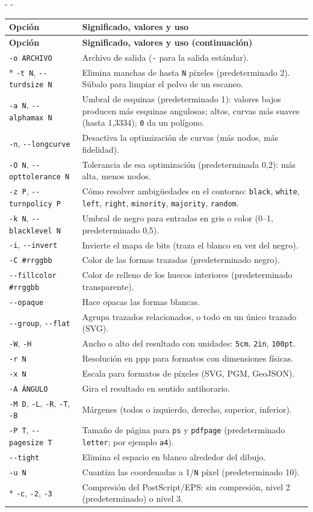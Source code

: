 \documentclass[11pt,a4paper]{article}
\makeatletter
\newcommand{\necesitaespacio}[1]{\par\penalty-100\begingroup
	\setlength{\dimen@}{#1}\dimen@ii\pagegoal\advance\dimen@ii-\pagetotal
	\ifdim\dimen@>\dimen@ii\ifdim\dimen@ii>\z@\vfil\fi\penalty-\@M\fi\endgroup}
\newenvironment{opciones}[1][Opción]{%
	\par\begingroup\small
	\begin{longtable}{L{4.25cm}L{11.2cm}}
		\toprule\rowcolor{tablacab}\cab{#1} & \cab{Significado, valores y uso} \\ \midrule
		\endfirsthead
		\toprule\rowcolor{tablacab}\cab{#1} & \cab{Significado, valores y uso (continuación)} \\ \midrule
		\endhead
		\bottomrule
		\endfoot}
	{\end{longtable}\endgroup}
\newcommand{\opt}[1]{\texttt{\textcolor{colopt}{#1}}}      %
\newcommand{\val}[1]{\texttt{#1}}                          %
\newcommand{\cab}[1]{\textbf{#1}}
\makeatother
\begin{document}
	\necesitaespacio{10\baselineskip}
	\begin{opciones}
		\opt{-o ARCHIVO} & Archivo de salida (\val{-} para la salida estándar).\\*
		\opt{-t N}, \opt{-{}-turdsize N} & Elimina manchas de hasta \val{N} píxeles (predeterminado 2). Súbalo para limpiar el polvo de un escaneo.\\
		\opt{-a N}, \opt{-{}-alphamax N} & Umbral de esquinas (predeterminado 1): valores bajos producen más esquinas angulosas; altos, curvas más suaves (hasta 1,3334); \val{0} da un polígono.\\
		\opt{-n}, \opt{-{}-longcurve} & Desactiva la optimización de curvas (más nodos, más fidelidad).\\
		\opt{-O N}, \opt{-{}-opttolerance N} & Tolerancia de esa optimización (predeterminada 0,2): más alta, menos nodos.\\
		\opt{-z P}, \opt{-{}-turnpolicy P} & Cómo resolver ambigüedades en el contorno: \val{black}, \val{white}, \val{left}, \val{right}, \val{minority}, \val{majority}, \val{random}.\\
		\opt{-k N}, \opt{-{}-blacklevel N} & Umbral de negro para entradas en gris o color (0--1, predeterminado 0,5).\\
		\opt{-i}, \opt{-{}-invert} & Invierte el mapa de bits (traza el blanco en vez del negro).\\
		\opt{-C \#rrggbb} & Color de las formas trazadas (predeterminado negro).\\
		\opt{-{}-fillcolor \#rrggbb} & Color de relleno de los huecos interiores (predeterminado transparente).\\
		\opt{-{}-opaque} & Hace opacas las formas blancas.\\
		\opt{-{}-group}, \opt{-{}-flat} & Agrupa trazados relacionados, o todo en un único trazado (SVG).\\
		\opt{-W}, \opt{-H} & Ancho o alto del resultado con unidades: \val{5cm}, \val{2in}, \val{100pt}.\\
		\opt{-r N} & Resolución en ppp para formatos con dimensiones físicas.\\
		\opt{-x N} & Escala para formatos de píxeles (SVG, PGM, GeoJSON).\\
		\opt{-A ÁNGULO} & Gira el resultado en sentido antihorario.\\
		\opt{-M D}, \opt{-L}, \opt{-R}, \opt{-T}, \opt{-B} & Márgenes (todos o izquierdo, derecho, superior, inferior).\\
		\opt{-P T}, \opt{-{}-pagesize T} & Tamaño de página para \val{ps} y \val{pdfpage} (predeterminado \val{letter}; por ejemplo \val{a4}).\\
		\opt{-{}-tight} & Elimina el espacio en blanco alrededor del dibujo.\\
		\opt{-u N} & Cuantiza las coordenadas a 1/\val{N} píxel (predeterminado 10).\\*
		\opt{-c}, \opt{-2}, \opt{-3} & Compresión del PostScript/EPS: sin compresión, nivel 2 (predeterminado) o nivel 3.\\
	\end{opciones}
	
\end{document}
